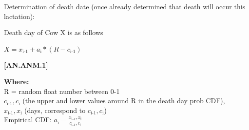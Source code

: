 \begin{refsection}
Determination of death date (once already determined that death will occur this lactation): 
\vspace{0.2cm}

Death day of Cow X is as follows
\begin{center}
    \(X = x_{\text{i-1}} + a_{\text{i}} * (R - c_{\text{i-1}})\)
\end{center}
\vspace{0.5cm}

            {\raggedleft \textbf{[AN.ANM.1]}\par}
    
\vspace{0.25cm}
\textbf{Where:} \\

\hspace*{1.5em} R = random float number between 0-1  \\

\hspace*{1.5em} $c_{\text{i-1}},c_{\text{i}}$ (the upper and lower values around R in the death day prob CDF),  \\

\hspace*{1.5em} $x_{\text{i-1}},x_{\text{i}}$ (days, correspond to $c_{\text{i-1}},c_{\text{i}}$) \\

\hspace*{1.5em} Empirical CDF: $a_{\text{i}} = \frac{x_{\text{i-1}},x_{\text{i}}}{c_{\text{i-1}},c_{\text{i}}}$ \\


\end{refsection}
